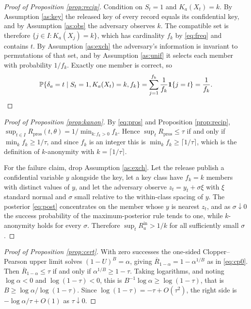 \documentclass[11pt,a4paper]{article}
\theoremstyle{plain}
\theoremstyle{definition}
\newcommand{\Prob}{\mathbb{P}}
\newcommand{\ind}[1]{\mathbf{1}\{#1\}}
\begin{document}
\begin{proof}[Proof of Proposition \ref{prop:recip}]
Condition on $S_t = 1$ and $K_a(X_t) = k$. By Assumption \ref{as:key} the
released key of every record equals its confidential key, and by Assumption
\ref{as:obs} the adversary observes $k$. The compatible set is therefore
$\{j \in I : K_a(X_j) = k\}$, which has cardinality $f_k$ by \eqref{eq:freq}
and contains $t$. By Assumption \ref{as:exch} the adversary's information is
invariant to permutations of that set, and by Assumption \ref{as:unif} it
selects each member with probability $1/f_k$. Exactly one member is correct,
so
\[
\Prob\{\delta_a = t \mid S_t = 1, K_a(X_t) = k, f_k\}
= \sum_{j=1}^{f_k} \frac{1}{f_k}\ind{j = t} = \frac{1}{f_k} . \qedhere
\]
\end{proof}

\begin{proof}[Proof of Proposition \ref{prop:kanon}]
By \eqref{eq:pros} and Proposition \ref{prop:recip}, $\sup_{t \in I}
R_{\mathrm{pros}}(t,\theta) = 1/\min_{k : f_k > 0} f_k$. Hence $\sup_t
R_{\mathrm{pros}} \leq \tau$ if and only if $\min_k f_k \geq 1/\tau$, and since
$f_k$ is an integer this is $\min_k f_k \geq \lceil 1/\tau \rceil$, which is the
definition of $k$-anonymity with $k = \lceil 1/\tau\rceil$.

For the failure claim, drop Assumption \ref{as:exch}. Let the release publish a confidential
variable $y$ alongside the key, let a key class have $f_k = k$ members with
distinct values of $y$, and let the adversary observe $z_t = y_t + \sigma \xi$ with $\xi$ standard normal and
$\sigma$ small relative to the within-class spacing of $y$. The posterior
\eqref{eq:post} concentrates on the member whose $y$ is nearest $z_t$, and as
$\sigma \downarrow 0$ the success probability of the maximum-posterior rule
tends to one, while $k$-anonymity holds for every $\sigma$. Therefore
$\sup_t R_a^{\mathrm{in}} > 1/k$ for all sufficiently small $\sigma$.
\end{proof}

\begin{proof}[Proof of Proposition \ref{prop:cert}]
With zero successes the one-sided Clopper--Pearson upper limit solves $(1 -
U)^B = \alpha$, giving $\overline{R}_{1-\alpha} = 1 - \alpha^{1/B}$ as in \eqref{eq:cp0}.
Then $\overline{R}_{1-\alpha} \leq \tau$ if and only if $\alpha^{1/B} \geq 1 - \tau$.
Taking logarithms, and noting $\log \alpha < 0$ and $\log(1-\tau) < 0$, this is
$B^{-1}\log\alpha \geq \log(1-\tau)$, that is $B \geq \log\alpha /
\log(1-\tau)$. Since $\log(1-\tau) = -\tau + O(\tau^2)$, the right side is
$-\log\alpha/\tau + O(1)$ as $\tau \downarrow 0$.
\end{proof}
\end{document}
